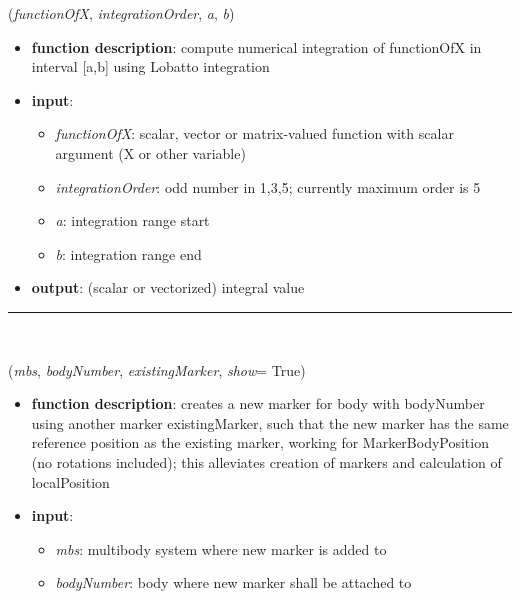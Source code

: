 \begin{itemize}[leftmargin=1.4cm]
\begin{itemize}[leftmargin=1.4cm]
\begin{itemize}[leftmargin=1.4cm]
\begin{itemize}[leftmargin=0.5cm]
\begin{flushleft}
({\it functionOfX}, {\it integrationOrder}, {\it a}, {\it b})
\end{flushleft}
\setlength{\itemindent}{0.7cm}
\begin{itemize}[leftmargin=0.7cm]
\item[--]
{\bf function description}: compute numerical integration of functionOfX in interval [a,b] using Lobatto integration
\item[--]
{\bf input}: \vspace{-6pt}
\begin{itemize}[leftmargin=1.2cm]
\setlength{\itemindent}{-0.7cm}
\item[]{\it functionOfX}: scalar, vector or matrix-valued function with scalar argument (X or other variable)
\item[]{\it integrationOrder}: odd number in {1,3,5}; currently maximum order is 5
\item[]{\it a}: integration range start
\item[]{\it b}: integration range end
\end{itemize}
\item[--]
{\bf output}: (scalar or vectorized) integral value
\vspace{12pt}\end{itemize}
%
\noindent\rule{8cm}{0.75pt}\vspace{1pt} \\ 
\begin{flushleft}
\label{sec:basicUtilities:GetOtherMarker}
({\it mbs}, {\it bodyNumber}, {\it existingMarker}, {\it show}= True)
\end{flushleft}
\setlength{\itemindent}{0.7cm}
\begin{itemize}[leftmargin=0.7cm]
\item[--]
{\bf function description}: creates a new marker for body with bodyNumber using another marker existingMarker, such that the new marker has the same reference position as the existing marker, working for MarkerBodyPosition (no rotations included); this alleviates creation of markers and calculation of localPosition
\item[--]
{\bf input}: \vspace{-6pt}
\begin{itemize}[leftmargin=1.2cm]
\setlength{\itemindent}{-0.7cm}
\item[]{\it mbs}: multibody system where new marker is added to
\item[]{\it bodyNumber}: body where new marker shall be attached to

\end{itemize}
\end{itemize}
\end{itemize}
\end{itemize}
\end{itemize}
\end{itemize}
